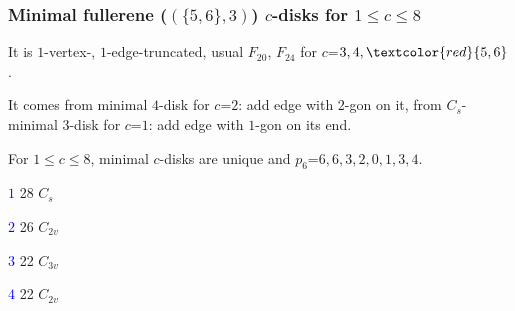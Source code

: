 \documentclass{beamer}
\begin{document}
\begin{frame}\frametitle{Minimal fullerene ($(\{5,6\},3)$) $c$-disks for 
$1\le c\le 8$}
\vspace{-1mm}
It is $1$-vertex-, $1$-edge-truncated, 
usual $F_{20}$, $F_{24}$ for 
 $c$=$3,4,\textcolor{red}{5,6}$.

It comes from minimal $4$-disk for $c$=$2$: add edge with $2$-gon on it,
 from $C_s$-minimal $3$-disk for $c$=$1$: add edge with $1$-gon on its end.

For $1$$\le$$ c$$\le$$ 8$, minimal $c$-disks are unique  and  
$p_6$=$6,6,3,2,0,1,3,4$.
\begin{center}
\begin{minipage}[b]{17mm}\centering
{}\par
\textcolor{blue}{$1$} 28 $C_s$  
\end{minipage}
\begin{minipage}[b]{17mm}
\centering
{}\par
\textcolor{blue}{$2$} 26 $C_{2v}$
\end{minipage}
\begin{minipage}[b]{17mm}
\centering
{}\par
\textcolor{blue}{$3$} 22 $C_{3v}$
\end{minipage}
\begin{minipage}[b]{17mm}
\centering   
{}\par
\textcolor{blue}{$4$} 22 $C_{2v}$
\end{minipage}
\end{center}
\vspace{-2mm}



\end{frame}
\end{document}
